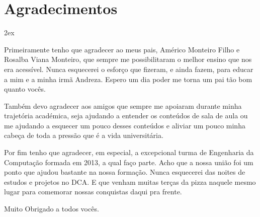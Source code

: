%
%


\chapter*{Agradecimentos}
\thispagestyle{empty}

\begin{trivlist}  \itemsep 2ex

\item Primeiramente tenho que agradecer ao meus pais, Américo Monteiro Filho e Rosalba Viana Monteiro, que sempre me possibilitaram o melhor ensino que nos era acessível. Nunca esquecerei o esforço que fizeram, e ainda fazem, para educar a mim e a minha irmã Andreza. Espero um dia poder me torna um pai tão bom quanto vocês.
  
\item Também devo agradecer aos amigos que sempre me apoiaram durante minha trajetória académica, seja ajudando a entender os conteúdos de sala de aula ou me ajudando a esquecer um pouco desses conteúdos e aliviar um pouco minha cabeça de toda a pressão que é a vida universitária.

\item Por fim tenho que agradecer, em especial, a excepcional turma de Engenharia da Computação formada em 2013, a qual faço parte. Acho que a nossa união foi um ponto que ajudou bastante na nossa formação. Nunca esquecerei das noites de estudos e projetos no DCA. E que venham muitas terças da pizza naquele mesmo lugar para comemorar nossas conquistas daqui pra frente.

\item Muito Obrigado a todos vocês.

\end{trivlist}






